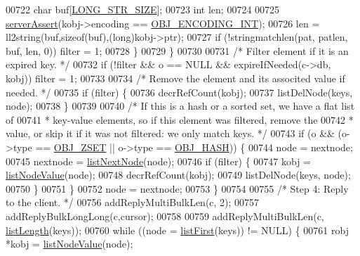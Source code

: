 \begin{DoxyCode}
00722                 \textcolor{keywordtype}{char} buf[\hyperlink{server_8h_a39ec35278876f65fc1ef70b049856ca3}{LONG\_STR\_SIZE}];
00723                 \textcolor{keywordtype}{int} len;
00724 
00725                 \hyperlink{server_8h_a88114b5169b4c382df6b56506285e56a}{serverAssert}(kobj->encoding == \hyperlink{server_8h_ae934cf008a0be0ef009c92c2d006a816}{OBJ\_ENCODING\_INT});
00726                 len = ll2string(buf,\textcolor{keyword}{sizeof}(buf),(\textcolor{keywordtype}{long})kobj->ptr);
00727                 \textcolor{keywordflow}{if} (!stringmatchlen(pat, patlen, buf, len, 0)) filter = 1;
00728             \}
00729         \}
00730 
00731         \textcolor{comment}{/* Filter element if it is an expired key. */}
00732         \textcolor{keywordflow}{if} (!filter && o == NULL && expireIfNeeded(c->db, kobj)) filter = 1;
00733 
00734         \textcolor{comment}{/* Remove the element and its associted value if needed. */}
00735         \textcolor{keywordflow}{if} (filter) \{
00736             decrRefCount(kobj);
00737             listDelNode(keys, node);
00738         \}
00739 
00740         \textcolor{comment}{/* If this is a hash or a sorted set, we have a flat list of}
00741 \textcolor{comment}{         * key-value elements, so if this element was filtered, remove the}
00742 \textcolor{comment}{         * value, or skip it if it was not filtered: we only match keys. */}
00743         \textcolor{keywordflow}{if} (o && (o->type == \hyperlink{server_8h_a8c356422ddbc03bd77694880a30a1953}{OBJ\_ZSET} || o->type == \hyperlink{server_8h_a87c05ba4f7f36741864277f02a4423fb}{OBJ\_HASH})) \{
00744             node = nextnode;
00745             nextnode = \hyperlink{adlist_8h_a87e048b4eea3aa88f4101d59de50b0fc}{listNextNode}(node);
00746             \textcolor{keywordflow}{if} (filter) \{
00747                 kobj = \hyperlink{adlist_8h_af84cae230e7180ebcda1e2736fce9f65}{listNodeValue}(node);
00748                 decrRefCount(kobj);
00749                 listDelNode(keys, node);
00750             \}
00751         \}
00752         node = nextnode;
00753     \}
00754 
00755     \textcolor{comment}{/* Step 4: Reply to the client. */}
00756     addReplyMultiBulkLen(c, 2);
00757     addReplyBulkLongLong(c,cursor);
00758 
00759     addReplyMultiBulkLen(c, \hyperlink{adlist_8h_afde0ab079f934670e82119b43120e94b}{listLength}(keys));
00760     \textcolor{keywordflow}{while} ((node = \hyperlink{adlist_8h_aa8dc514bbe217bb2e87c1c77cfa84690}{listFirst}(keys)) != NULL) \{
00761         robj *kobj = \hyperlink{adlist_8h_af84cae230e7180ebcda1e2736fce9f65}{listNodeValue}(node);

\end{DoxyCode}
